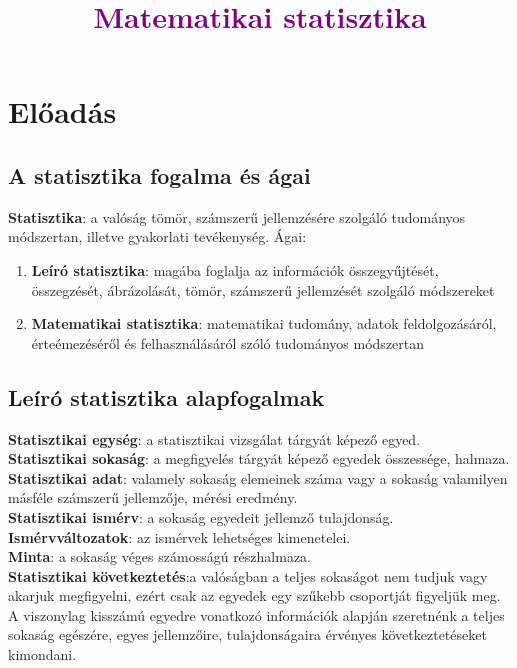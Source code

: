 \documentclass[12pt]{article}
\title{\textcolor{purple}{\Huge\textbf{Matematikai statisztika}}}
\begin{document}
    \maketitle

    \newpage
    \section{Előadás}
    \subsection{A statisztika fogalma és ágai}
    \textbf{Statisztika}: a valóság tömör, számszerű jellemzésére szolgáló tudományos módszertan, illetve gyakorlati tevékenység.
    Ágai:
    \begin{enumerate}
        \item \textbf{Leíró statisztika}: magába foglalja az információk összegyűjtését, összegzését, ábrázolását, tömör, számszerű jellemzését szolgáló módszereket
        \item \textbf{Matematikai statisztika}: matematikai tudomány, adatok feldolgozásáról, érteémezéséről és felhasználásáról szóló tudományos módszertan
    \end{enumerate}

    \subsection{Leíró statisztika alapfogalmak}
    \textbf{Statisztikai egység}: a statisztikai vizsgálat tárgyát képező egyed.\\
    \textbf{Statisztikai sokaság}: a megfigyelés tárgyát képező egyedek összessége, halmaza.\\
    \textbf{Statisztikai adat}: valamely sokaság elemeinek száma vagy a sokaság valamilyen másféle számszerű jellemzője, mérési eredmény.\\
    \textbf{Statisztikai ismérv}: a sokaság egyedeit jellemző tulajdonság.\\
    \textbf{Ismérvváltozatok}: az ismérvek lehetséges kimenetelei.\\
    \textbf{Minta}: a sokaság véges számosságú részhalmaza.\\
    \textbf{Statisztikai következtetés}:a valóságban a teljes sokaságot nem tudjuk vagy akarjuk megfigyelni, ezért csak az egyedek egy szűkebb csoportját figyeljük meg. A viszonylag kisszámú egyedre vonatkozó információk alapján szeretnénk a teljes sokaság egészére, egyes jellemzőire, tulajdonságaira érvényes következtetéseket kimondani.\\
\end{document}
